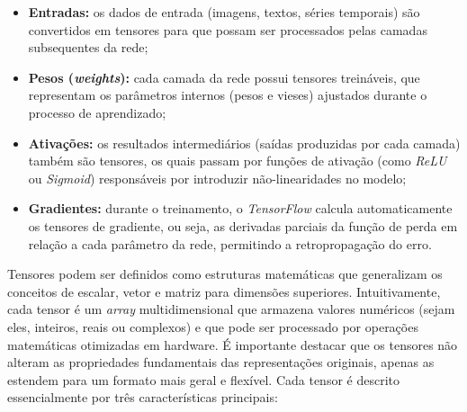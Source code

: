 \begin{itemize}
    \item \textbf{Entradas:} os dados de entrada (imagens, textos, séries temporais) são convertidos em tensores para que possam ser processados pelas camadas subsequentes da rede;

    \item \textbf{Pesos (\textit{weights}):} cada camada da rede possui tensores treináveis, que representam os parâmetros internos (pesos e vieses) ajustados durante o processo de aprendizado;

    \item \textbf{Ativações:} os resultados intermediários (saídas produzidas por cada camada) também são tensores, os quais passam por funções de ativação (como \textit{\acs{ReLU}} ou \textit{Sigmoid}) responsáveis por introduzir não-linearidades no modelo;

    \item \textbf{Gradientes:} durante o treinamento, o \textit{TensorFlow} calcula automaticamente os tensores de gradiente, ou seja, as derivadas parciais da função de perda em relação a cada parâmetro da rede, permitindo a retropropagação do erro.
\end{itemize}

Tensores podem ser definidos como estruturas matemáticas que generalizam os conceitos de escalar, vetor e matriz para dimensões superiores. Intuitivamente, cada tensor é um \textit{array} multidimensional que armazena valores numéricos (sejam eles, inteiros, reais ou complexos) e que pode ser processado por operações matemáticas otimizadas em hardware. É importante destacar que os tensores não alteram as propriedades fundamentais das representações originais, apenas as estendem para um formato mais geral e flexível. Cada tensor é descrito essencialmente por três características principais:

